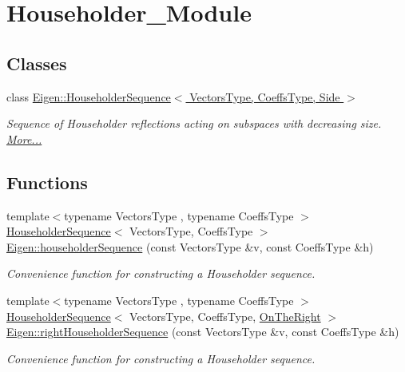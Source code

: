 \hypertarget{group___householder___module}{}\section{Householder\+\_\+\+Module}
\label{group___householder___module}
\subsection*{Classes}
\begin{DoxyCompactItemize}
\item 
class \hyperlink{group___householder___module_class_eigen_1_1_householder_sequence}{Eigen\+::\+Householder\+Sequence$<$ Vectors\+Type, Coeffs\+Type, Side $>$}
\begin{DoxyCompactList}\small\item\em Sequence of Householder reflections acting on subspaces with decreasing size.  \hyperlink{group___householder___module_class_eigen_1_1_householder_sequence}{More...}\end{DoxyCompactList}\end{DoxyCompactItemize}
\subsection*{Functions}
\begin{DoxyCompactItemize}
\item 
{\footnotesize template$<$typename Vectors\+Type , typename Coeffs\+Type $>$ }\\\hyperlink{group___householder___module_class_eigen_1_1_householder_sequence}{Householder\+Sequence}$<$ Vectors\+Type, Coeffs\+Type $>$ \hyperlink{group___householder___module_ga4bd4b85120e014cf1125a054b02d4d92}{Eigen\+::householder\+Sequence} (const Vectors\+Type \&v, const Coeffs\+Type \&h)
\begin{DoxyCompactList}\small\item\em Convenience function for constructing a Householder sequence. \end{DoxyCompactList}\item 
{\footnotesize template$<$typename Vectors\+Type , typename Coeffs\+Type $>$ }\\\hyperlink{group___householder___module_class_eigen_1_1_householder_sequence}{Householder\+Sequence}$<$ Vectors\+Type, Coeffs\+Type, \hyperlink{group__enums_ggac22de43beeac7a78b384f99bed5cee0ba99dc75d8e00b6c3a5bdc31940f47492b}{On\+The\+Right} $>$ \hyperlink{group___householder___module_ga59f16274f9e66f902f1a4b3f23e8b002}{Eigen\+::right\+Householder\+Sequence} (const Vectors\+Type \&v, const Coeffs\+Type \&h)
\begin{DoxyCompactList}\small\item\em Convenience function for constructing a Householder sequence. \end{DoxyCompactList}\end{DoxyCompactItemize}


